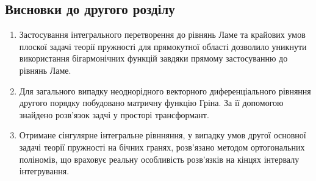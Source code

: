 \subsection{Висновки до другого розділу}
\begin{enumerate}
    \item Застосування інтегрального перетворення до рівнянь Ламе та крайових умов плоскої задачі теорії пружності для прямокутної області
    дозволило уникнути використання бігармонічних функцій завдяки прямому застосуванню до рівнянь Ламе.
    \item Для загального випадку неоднорідного векторного диференціального рівняння другого порядку побудовано матричну функцію Гріна.
    За її допомогою знайдено розв'язок задчі у просторі трансформант.
    \item Отримане сінгулярне інтегральне рівнняння, у випадку умов другої основної задачі теорії пружності на бічних гранях, розв'язано методом ортогональних поліномів,
    що враховує реальну особливість розв'язків на кінцях інтервалу інтегрування.
\end{enumerate}